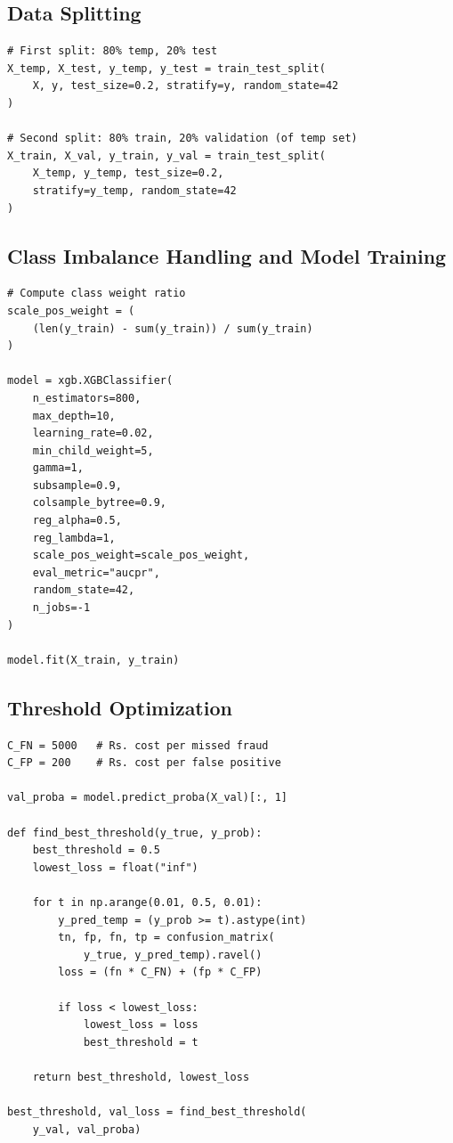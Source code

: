 \subsection{Data Splitting}

\begin{lstlisting}[caption={Stratified three-way data split}, label={lst:split}]
# First split: 80% temp, 20% test
X_temp, X_test, y_temp, y_test = train_test_split(
    X, y, test_size=0.2, stratify=y, random_state=42
)

# Second split: 80% train, 20% validation (of temp set)
X_train, X_val, y_train, y_val = train_test_split(
    X_temp, y_temp, test_size=0.2,
    stratify=y_temp, random_state=42
)
\end{lstlisting}

\subsection{Class Imbalance Handling and Model Training}

\begin{lstlisting}[caption={Imbalance weighting and XGBoost training}, label={lst:training}]
# Compute class weight ratio
scale_pos_weight = (
    (len(y_train) - sum(y_train)) / sum(y_train)
)

model = xgb.XGBClassifier(
    n_estimators=800,
    max_depth=10,
    learning_rate=0.02,
    min_child_weight=5,
    gamma=1,
    subsample=0.9,
    colsample_bytree=0.9,
    reg_alpha=0.5,
    reg_lambda=1,
    scale_pos_weight=scale_pos_weight,
    eval_metric="aucpr",
    random_state=42,
    n_jobs=-1
)

model.fit(X_train, y_train)
\end{lstlisting}

\subsection{Threshold Optimization}

\begin{lstlisting}[caption={Validation-set cost-based threshold finding}, label={lst:thresh}]
C_FN = 5000   # Rs. cost per missed fraud
C_FP = 200    # Rs. cost per false positive

val_proba = model.predict_proba(X_val)[:, 1]

def find_best_threshold(y_true, y_prob):
    best_threshold = 0.5
    lowest_loss = float("inf")

    for t in np.arange(0.01, 0.5, 0.01):
        y_pred_temp = (y_prob >= t).astype(int)
        tn, fp, fn, tp = confusion_matrix(
            y_true, y_pred_temp).ravel()
        loss = (fn * C_FN) + (fp * C_FP)

        if loss < lowest_loss:
            lowest_loss = loss
            best_threshold = t

    return best_threshold, lowest_loss

best_threshold, val_loss = find_best_threshold(
    y_val, val_proba)
\end{lstlisting}

